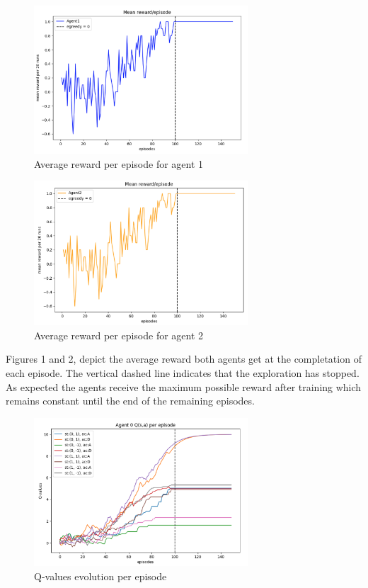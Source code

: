 \documentclass[10pt,a4paper,twocolumn]{article}
\begin{document}
		\begin{figure}[ht!]
		\centering
		\includegraphics[width=80mm]{avg_reward_agent0}
		\caption{Average reward per episode for agent 1 \label{overflow}}
	\end{figure}
	
	
	\begin{figure}[ht!]
		\centering
		\includegraphics[width=80mm]{avg_reward_agent1}
		\caption{Average reward per episode for agent 2 \label{overflow}}
	\end{figure}
	
	Figures 1 and 2, depict the average reward both agents get at the completation of each episode. The vertical dashed line indicates that the exploration has stopped. As expected the agents receive the maximum possible reward after training which remains constant until the end of the remaining episodes.
	
	
	\begin{figure}[ht!]
		\centering
		\includegraphics[width=80mm]{q_values_agent0}
		\caption{Q-values evolution per episode \label{overflow}}
	\end{figure}
	
\end{document}
